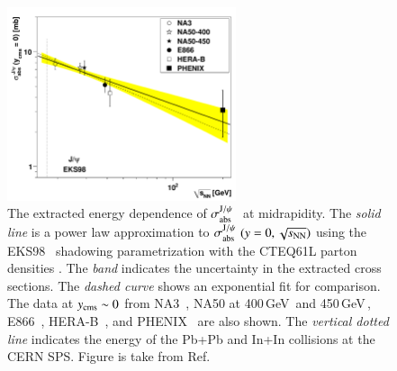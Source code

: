 \begin{figure}[tb]
   \begin{center}
      \includegraphics[width=0.6\textwidth]{Figures/AbsCrossVsE.pdf}
      \caption{The extracted energy dependence of 
               $\sigma_{\rm abs}^{\mathrm{J}/\psi\hspace {0.05in}}$ at
               midrapidity.  The {\it solid line} is a 
               power law approximation 
               to $\sigma_{\rm abs}^{\mathrm{J}/\psi\hspace {0.05in}}(y=0,\sqrt{s_{\rm NN}})$ using the 
               EKS98~{\protect\cite{Eskola:1998iy,Eskola:1998df}}
               shadowing parametrization with the CTEQ61L parton densities
               {\protect\cite{Pumplin:2002vw,Stump:2003yu}}.  
               The {\it band} 
               indicates the uncertainty in the extracted cross
               sections.  The {\it dashed curve} shows an 
               exponential fit for comparison.  The data at
               $y_{\rm cms} \sim 0$ from NA3~\cite{Badier:1983dg}, 
               NA50 at 400\,GeV\,{\protect\cite{Alessandro:2006jt}} and 
               450\,GeV\,\cite{Alessandro:2003pc},
               E866~\cite{Leitch:1999ea}, 
               HERA-B~\cite{Abt:2008ya}, and
               PHENIX~\cite{daSilva:2009yy} are also shown.  
               The {\it vertical dotted line} indicates the energy 
               of the Pb+Pb and In+In collisions at the
               CERN SPS. Figure is take from Ref.~\cite{Lourenco:2008sk} 
      }
      \label{Fig:AbsCrossVsE}
   \end{center}
\end{figure}



